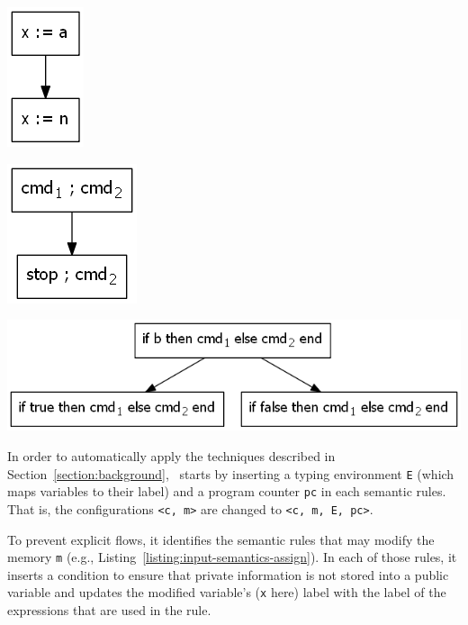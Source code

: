 \documentclass[sigplan,10pt,screen]{acmart}
\begin{document}
\includegraphics[width=0.25\linewidth]{images/graph-assign.png}

\includegraphics[width=0.25\linewidth]{images/graph-sequence.png}

\includegraphics[width=\linewidth]{images/graph-if.png}

In order to automatically apply the techniques described in Section~\ref{section:background}, \ottifc\ starts by inserting a typing environment \lstinline{E} (which maps variables to their label) and a program counter \lstinline{pc} in each semantic rules. That is, the configurations \lstinline{<c, m>} are changed to \lstinline{<c, m, E, pc>}.

To prevent explicit flows, it identifies the semantic rules that may modify the memory \lstinline{m} (e.g., Listing~\ref{listing:input-semantics-assign}). In each of those rules, it inserts a condition to ensure that private information is not stored into a public variable and updates the modified variable's (\lstinline{x} here) label with the label of the expressions that are used in the rule.

\end{document}
